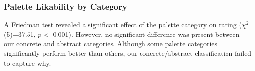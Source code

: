 \subsubsection{Palette Likability by Category}
A Friedman test revealed a significant effect of the palette category on rating ($\chi^2$(5)=37.51, $p <$ 0.001). However, no significant difference was present between our concrete and abstract categories. Although some palette categories significantly perform better than others, our concrete/abstract classification failed to capture why.
\begin{center}
\end{center}